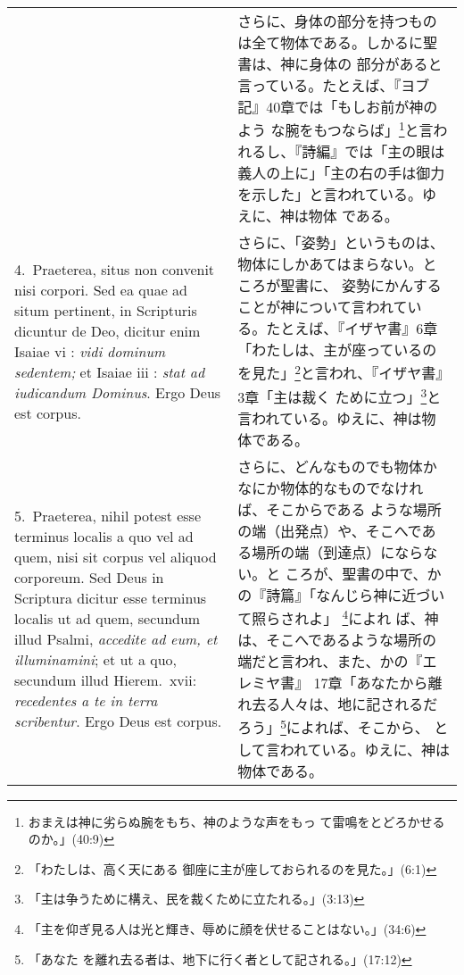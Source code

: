 \documentclass[10pt]{jsarticle} %
\begin{document}
\begin{longtable}{p{21em}p{21em}}
&

さらに、身体の部分を持つものは全て物体である。しかるに聖書は、神に身体の
 部分があると言っている。たとえば、『ヨブ記』40章では「もしお前が神のよう
 な腕をもつならば」\footnote{おまえは神に劣らぬ腕をもち、神のような声をもっ
 て雷鳴をとどろかせるのか。」(40:9)}と言われるし、『詩編』では「主の眼は
 義人の上に」「主の右の手は御力を示した」と言われている。ゆえに、神は物体
 である。

\\


4.~{\sc  Praeterea}, situs non convenit nisi corpori. Sed ea quae ad situm
 pertinent, in Scripturis dicuntur de Deo, dicitur enim Isaiae {\sc vi} :
 {\it vidi dominum sedentem;} et Isaiae {\sc iii} : {\it stat ad
 iudicandum Dominus}. Ergo Deus est corpus.

&

さらに、「姿勢」というものは、物体にしかあてはまらない。ところが聖書に、
 姿勢にかんすることが神について言われている。たとえば、『イザヤ書』6章
 「わたしは、主が座っているのを見た」\footnote{「わたしは、高く天にある
 御座に主が座しておられるのを見た。」(6:1)}と言われ、『イザヤ書』3章「主は裁く
 ために立つ」\footnote{「主は争うために構え、民を裁くために立たれる。」(3:13)}と言われている。ゆえに、神は物体である。

\\


5.~{\sc Praeterea}, nihil potest esse terminus localis a quo vel ad
 quem, nisi sit corpus vel aliquod corporeum. Sed Deus in Scriptura
 dicitur esse terminus localis ut ad quem, secundum illud Psalmi, {\it
 accedite ad eum, et illuminamini}; et ut a quo, secundum illud
 Hierem.~{\sc xvii}: {\it recedentes a te in terra scribentur}. Ergo
 Deus est corpus. 

 &

さらに、どんなものでも物体かなにか物体的なものでなければ、そこからである
 ような場所の端（出発点）や、そこへである場所の端（到達点）にならない。と
 ころが、聖書の中で、かの『詩篇』「なんじら神に近づいて照らされよ」
 \footnote{「主を仰ぎ見る人は光と輝き、辱めに顔を伏せることはない。」(34:6)}によれ
 ば、神は、そこへであるような場所の端だと言われ、また、かの『エレミヤ書』
 17章「あなたから離れ去る人々は、地に記されるだろう」\footnote{「あなた
 を離れ去る者は、地下に行く者として記される。」(17:12)}によれば、そこから、
 として言われている。ゆえに、神は物体である。

\\




\end{longtable}
\end{document}
